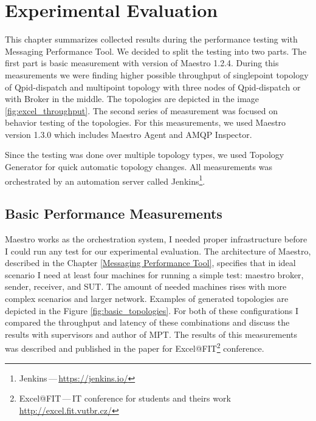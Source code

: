 
\chapter{Experimental Evaluation}
\label{Experimental Evaluation}
This chapter summarizes collected results during the performance testing with Messaging Performance Tool. We decided to split the testing into two parts. The first part is basic measurement with version of Maestro 1.2.4. During this measurements we were finding higher possible throughput of singlepoint topology of Qpid-dispatch and multipoint topology with three nodes of Qpid-dispatch or with Broker in the middle. The topologies are depicted in the image \ref{fig:excel_throughput}. The second series of measurement was focused on behavior testing of the topologies. For this measurements, we used Maestro version 1.3.0 which includes Maestro Agent and AMQP Inspector.

Since the testing was done over multiple topology types, we used Topology Generator for quick automatic topology changes. All measurements was orchestrated by an automation server called Jenkins\footnote{Jenkins\,---\,\url{https://jenkins.io/}}.

\section{Basic Performance Measurements}
\label{Basic Performance Measurements}
Maestro works as the orchestration system, I needed proper infrastructure before I could run any test for our experimental evaluation. The architecture of Maestro, described in the Chapter \ref{Messaging Performance Tool}, specifies that in ideal scenario I need at least four machines for running a simple test: maestro broker, sender, receiver, and SUT. The amount of needed machines rises with more complex scenarios and larger network. Examples of generated topologies are depicted in the Figure \ref{fig:basic_topologies}. For both of these configurations I compared the throughput and latency of these combinations and discuss the results with supervisors and author of MPT. The results of this measurements was described and published in the paper for Excel@FIT\footnote{Excel@FIT\,---\,IT conference for students and theirs work \url{http://excel.fit.vutbr.cz/}} conference.

